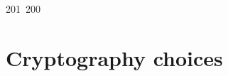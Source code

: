 201~200~\documentclass{article}
\begin{document}
	                                                                                                                                                                                                                                                                                                	                                                                                                                                        	    	                                                                                                	                                                                                                                                                                                                                                                \section{Cryptography choices}
\end{document}
